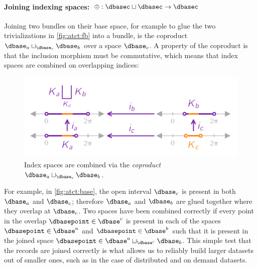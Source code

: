 \documentclass[journal]{IEEEtran}
\theoremstyle{definition}
\theoremstyle{remark}
\begin{document}
\paragraph{Joining indexing spaces: $\oplus: \mathcal{\dbasec} \sqcup \mathcal{\dbasec} \rightarrow \mathcal{\dbasec}$}
Joining two bundles on their base space, for example to glue the two trivializations in \autoref{fig:atct:fb} into a bundle, is the coproduct $\dbase_{a} \sqcup_{\dbase_{c}} \dbase_{b}$ over a space $\dbase_{c}$. A property of the coproduct is that the inclusion morphism must be commutative, which means that index spaces are combined on overlapping indices:
\begin{figure}[h]
  \includegraphics*[width=1\columnwidth]{figures/tex/k_coproduct.pdf}  \caption{Index spaces are combined via the \textit{coproduct} $\dbase_{a}\sqcup_{\dbase_c} \dbase_{b}$.}
  \label{fig:atct:base}
\end{figure}
 For example, in \autoref{fig:atct:base}, the open interval $\dbase_c$ is present in both $\dbase_a$ and $\dbase_c$; therefore $\dbase_a$ and $\dbase_b$ are glued together where they overlap at $\dbase_c$.  Two spaces have been combined correctly if every point in the overlap  $\dbasepoint \in \dbase^{c}$ is present in each of the spaces $\dbasepoint \in \dbase^{a}$ and $\dbasepoint \in \dbase^{b}$ such that it is present in the joined space $\dbasepoint \in \dbase^{a}\sqcup_{\dbase^{c}} \dbase_{b}$. This simple test that the records are joined correctly is what allows us to reliably build larger datasets out of smaller ones, such as in the case of distributed and on demand datasets.
\end{document}
